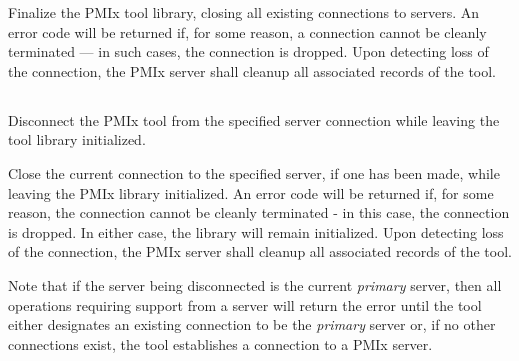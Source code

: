 {

\returnsimple

\descr

Finalize the \ac{PMIx} tool library, closing all existing connections to
servers.
An error code will be returned if, for some reason, a connection cannot be
cleanly terminated --- in such cases, the connection is dropped. Upon
detecting loss of the connection, the \ac{PMIx} server shall cleanup all
associated records of the tool.


\subsection{}

\summary

Disconnect the \ac{PMIx} tool from the specified server connection while leaving the tool library initialized.

\format


\begin{arglist}
\end{arglist}

\returnsimple

\descr

Close the current connection to the specified server, if one has been made, while leaving the \ac{PMIx} library initialized. An error code will be returned if, for some reason, the connection cannot be cleanly terminated - in this case, the connection is dropped. In either case, the library will remain initialized.  Upon
detecting loss of the connection, the \ac{PMIx} server shall cleanup all
associated records of the tool.


Note that if the server being disconnected is the current \emph{primary} server, then all operations requiring support from a server will return the  error until the tool either designates an existing connection to be the \emph{primary} server or, if no other connections exist, the tool establishes a connection to a \ac{PMIx} server.


}
